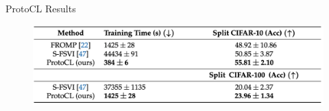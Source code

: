 \documentclass[12pt,aspectratio=169, handout]{beamer}
\begin{document}
\begin{frame}{ProtoCL Results}
    \begin{figure}
		\centering
		\includegraphics[width=\textwidth]{"images/Table2_pic.png"}
	\end{figure}
\end{frame}
\end{document}
